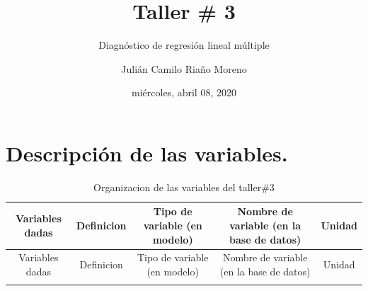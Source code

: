 \documentclass[
]{article}
\title{Taller \# 3}
\subtitle{Diagnóstico de regresión lineal múltiple}
\author{Julián Camilo Riaño Moreno}
\date{miércoles, abril 08, 2020}
\begin{document}
\maketitle

{
\setcounter{tocdepth}{3}
\tableofcontents
}
\pagebreak

\hypertarget{descripciuxf3n-de-las-variables.}{%
\section{Descripción de las
variables.}\label{descripciuxf3n-de-las-variables.}}

\begin{longtable}[]{@{}ccccc@{}}
\caption{Organizacion de las variables del taller\#3}\tabularnewline
\toprule
\begin{minipage}[b]{0.13\columnwidth}\centering
Variables dadas\strut
\end{minipage} & \begin{minipage}[b]{0.21\columnwidth}\centering
Definicion\strut
\end{minipage} & \begin{minipage}[b]{0.22\columnwidth}\centering
Tipo de variable (en modelo)\strut
\end{minipage} & \begin{minipage}[b]{0.23\columnwidth}\centering
Nombre de variable (en la base de datos)\strut
\end{minipage} & \begin{minipage}[b]{0.06\columnwidth}\centering
Unidad\strut
\end{minipage}\tabularnewline
\midrule
\endfirsthead
\toprule
\begin{minipage}[b]{0.13\columnwidth}\centering
Variables dadas\strut
\end{minipage} & \begin{minipage}[b]{0.21\columnwidth}\centering
Definicion\strut
\end{minipage} & \begin{minipage}[b]{0.22\columnwidth}\centering
Tipo de variable (en modelo)\strut
\end{minipage} & \begin{minipage}[b]{0.23\columnwidth}\centering
Nombre de variable (en la base de datos)\strut
\end{minipage} & \begin{minipage}[b]{0.06\columnwidth}\centering
Unidad\strut
\end{minipage}\tabularnewline
\midrule
\endhead
\begin{minipage}[t]{0.13\columnwidth}\centering

\end{minipage}
\end{longtable}
\end{document}

